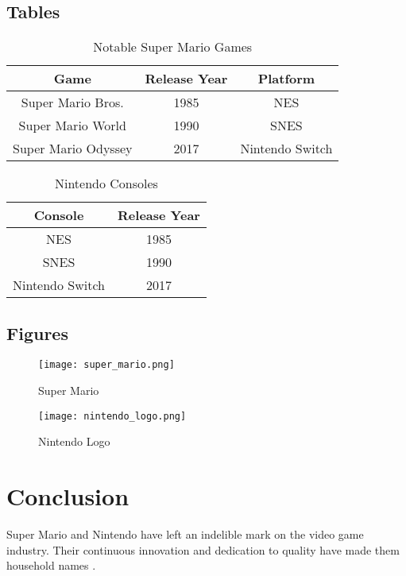 \documentclass[conference]{IEEEtran}
\begin{document}
\subsection{Tables}

\begin{table}[h!]
\centering
\begin{tabular}{|c|c|c|}
\hline
Game & Release Year & Platform \\
\hline
Super Mario Bros. & 1985 & NES \\
Super Mario World & 1990 & SNES \\
Super Mario Odyssey & 2017 & Nintendo Switch \\
\hline
\end{tabular}
\caption{Notable Super Mario Games}
\label{table:games}
\end{table}

\begin{table}[h!]
\centering
\begin{tabular}{|c|c|}
\hline
Console & Release Year \\
\hline
NES & 1985 \\
SNES & 1990 \\
Nintendo Switch & 2017 \\
\hline
\end{tabular}
\caption{Nintendo Consoles}
\label{table:consoles}
\end{table}

\subsection{Figures}

\begin{figure}[h!]
\centering
\texttt{[image: super\_mario.png]}
\caption{Super Mario}
\label{fig:mario}
\end{figure}

\begin{figure}[h!]
\centering
\texttt{[image: nintendo\_logo.png]}
\caption{Nintendo Logo}
\label{fig:nintendo}
\end{figure}

\section{Conclusion}
Super Mario and Nintendo have left an indelible mark on the video game industry. Their continuous innovation and dedication to quality have made them household names \cite{ref9, ref10}.

\printbibliography
\end{document}
